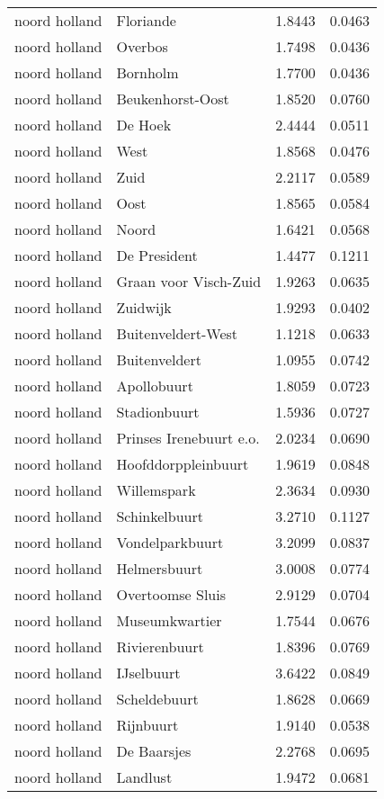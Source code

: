 \begin{longtable}{llcc}
noord holland & Floriande & 1.8443 & 0.0463 \\
noord holland & Overbos & 1.7498 & 0.0436 \\
noord holland & Bornholm & 1.7700 & 0.0436 \\
noord holland & Beukenhorst-Oost & 1.8520 & 0.0760 \\
noord holland & De Hoek & 2.4444 & 0.0511 \\
noord holland & West & 1.8568 & 0.0476 \\
noord holland & Zuid & 2.2117 & 0.0589 \\
noord holland & Oost & 1.8565 & 0.0584 \\
noord holland & Noord & 1.6421 & 0.0568 \\
noord holland & De President & 1.4477 & 0.1211 \\
noord holland & Graan voor Visch-Zuid & 1.9263 & 0.0635 \\
noord holland & Zuidwijk & 1.9293 & 0.0402 \\
noord holland & Buitenveldert-West & 1.1218 & 0.0633 \\
noord holland & Buitenveldert & 1.0955 & 0.0742 \\
noord holland & Apollobuurt & 1.8059 & 0.0723 \\
noord holland & Stadionbuurt & 1.5936 & 0.0727 \\
noord holland & Prinses Irenebuurt e.o. & 2.0234 & 0.0690 \\
noord holland & Hoofddorppleinbuurt & 1.9619 & 0.0848 \\
noord holland & Willemspark & 2.3634 & 0.0930 \\
noord holland & Schinkelbuurt & 3.2710 & 0.1127 \\
noord holland & Vondelparkbuurt & 3.2099 & 0.0837 \\
noord holland & Helmersbuurt & 3.0008 & 0.0774 \\
noord holland & Overtoomse Sluis & 2.9129 & 0.0704 \\
noord holland & Museumkwartier & 1.7544 & 0.0676 \\
noord holland & Rivierenbuurt & 1.8396 & 0.0769 \\
noord holland & IJselbuurt & 3.6422 & 0.0849 \\
noord holland & Scheldebuurt & 1.8628 & 0.0669 \\
noord holland & Rijnbuurt & 1.9140 & 0.0538 \\
noord holland & De Baarsjes & 2.2768 & 0.0695 \\
noord holland & Landlust & 1.9472 & 0.0681 \\

\end{longtable}
